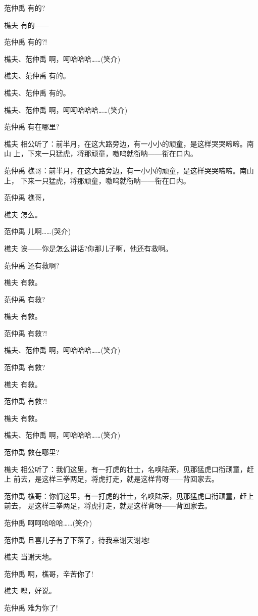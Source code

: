 范仲禹 有的?

樵夫 有的------

范仲禹 有的?!

樵夫、范仲禹 啊，呵哈哈哈\ldots{}\ldots{}(笑介)

樵夫、范仲禹 有的。

樵夫、范仲禹 有的。

樵夫、范仲禹 啊，呵呵哈哈哈\ldots{}\ldots{}(笑介)

范仲禹 有在哪里?

樵夫
相公听了：前半月，在这大路旁边，有一小小的顽童，是这样哭哭啼啼。南山
上，下来一只猛虎，将那顽童，嗷呜就衔呐------衔在口内。

范仲禹
樵哥：前半月，在这大路旁边，有一小小的顽童，是这样哭哭啼啼。南山上，
下来一只猛虎，将那顽童，嗷呜就衔呐------衔在口内。

范仲禹 樵哥，

樵夫 怎么。

范仲禹 儿啊\ldots{}\ldots{}(哭介)

樵夫 诶------你是怎么讲话?你那儿子啊，他还有救啊。

范仲禹 还有救啊?

樵夫 有救。

范仲禹 有救?

樵夫 有救。

范仲禹 有救?!

樵夫、范仲禹 啊，呵哈哈哈\ldots{}\ldots{}(笑介)

范仲禹 有救?

樵夫 有救。

范仲禹 有救?!

樵夫 有救。

樵夫、范仲禹 啊，呵哈哈哈\ldots{}\ldots{}(笑介)

范仲禹 救在哪里?

樵夫
相公听了：我们这里，有一打虎的壮士，名唤陆荣，见那猛虎口衔顽童，赶上
前去，是这样三拳两足，将虎打走，就是这样背呀------背回家去。

范仲禹
樵哥：你们这里，有一打虎的壮士，名唤陆荣，见那猛虎口衔顽童，赶上前去，
是这样三拳两足，将虎打走，就是这样背呀------背回家去。

范仲禹 呵呵哈哈哈\ldots{}\ldots{}(笑介)

范仲禹 且喜儿子有了下落了，待我来谢天谢地!

樵夫 当谢天地。

范仲禹 啊，樵哥，辛苦你了!

樵夫 嗯，好说。

范仲禹 难为你了!

